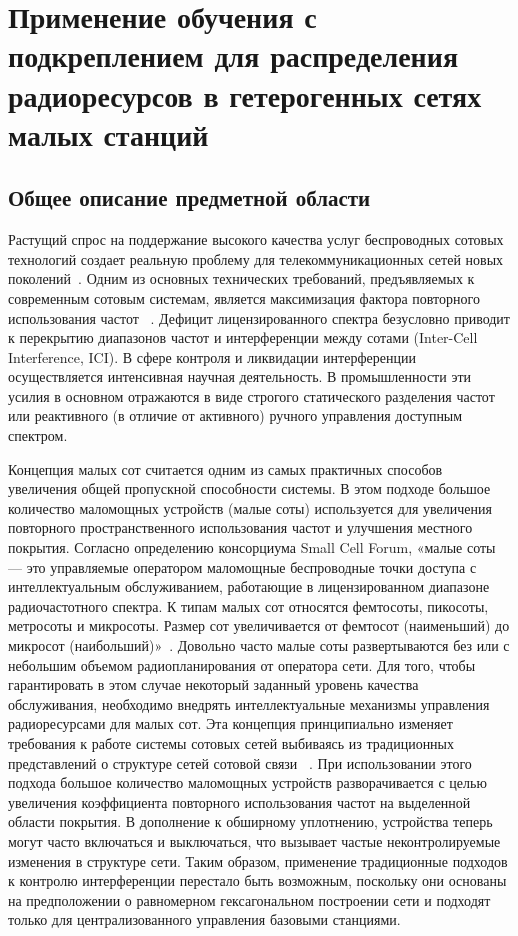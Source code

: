 \chapter{Применение обучения с подкреплением для распределения радиоресурсов в гетерогенных сетях малых станций} \label{chapt2}

\section{Общее описание предметной области} \label{sect2_1}

Растущий спрос на поддержание высокого качества услуг беспроводных сотовых технологий создает реальную проблему для телекоммуникационных сетей новых поколений~\cite{TS36.300}. Одним из основных технических требований, предъявляемых к современным сотовым системам, является максимизация фактора повторного использования частот ~\cite{M.1645}. Дефицит лицензированного спектра безусловно приводит к перекрытию диапазонов частот и интерференции между сотами (Inter-Cell Interference, ICI). В сфере контроля и ликвидации интерференции осуществляется интенсивная научная деятельность. В промышленности эти усилия в основном отражаются в виде строгого статического разделения частот или реактивного (в отличие от активного) ручного управления доступным спектром.

Концепция малых сот считается одним из самых практичных способов увеличения общей пропускной способности системы. В этом подходе большое количество маломощных устройств (малые соты) используется для увеличения повторного пространственного использования частот и улучшения местного покрытия. Согласно определению консорциума Small Cell Forum, «малые соты — это управляемые оператором маломощные беспроводные точки доступа с интеллектуальным обслуживанием, работающие в лицензированном диапазоне радиочастотного спектра. К типам малых сот относятся фемтосоты, пикосоты, метросоты и микросоты. Размер сот увеличивается от фемтосот (наименьший) до микросот (наибольший)»~\cite{6171992}. Довольно часто малые соты развертываются без или с небольшим объемом радиопланирования от оператора сети. Для того, чтобы гарантировать в этом случае некоторый заданный уровень качества обслуживания, необходимо внедрять интеллектуальные механизмы управления радиоресурсами для малых сот. Эта концепция принципиально изменяет требования к работе системы сотовых сетей выбиваясь из традиционных представлений о структуре сетей сотовой связи ~\cite{6211486}. При использовании этого подхода большое количество маломощных устройств разворачивается с целью увеличения коэффициента повторного использования частот на выделенной области покрытия. В дополнение к обширному уплотнению, устройства теперь могут часто включаться и выключаться, что вызывает частые неконтролируемые изменения в структуре сети. Таким образом, применение традиционные подходов к контролю интерференции перестало быть возможным, поскольку они основаны на предположении о равномерном гексагональном построении сети и подходят только для централизованного управления базовыми станциями.

